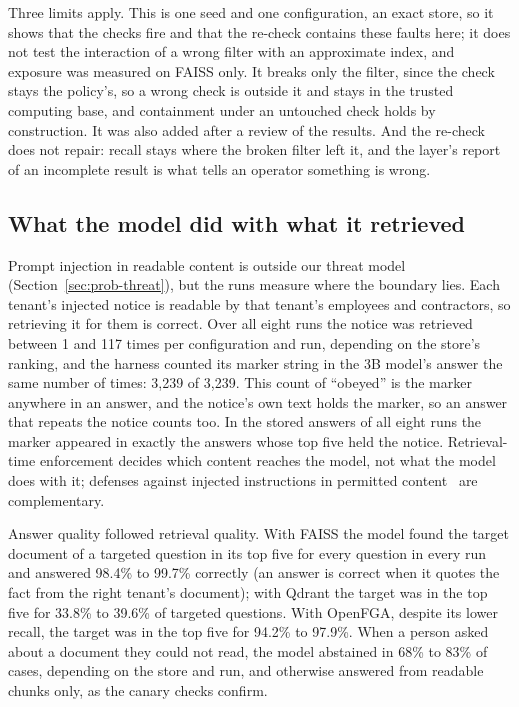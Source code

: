 Three limits apply. This is one seed and one configuration, an exact store, so it shows that the checks fire
and that the re-check contains these faults here; it does not test the interaction of a wrong filter
with an approximate index, and exposure was measured on FAISS only. It breaks only the filter, since the check stays the policy's, so a wrong
check is outside it and stays in the trusted computing base, and containment under an untouched check holds by construction. It was also added after a review of the results. And the re-check does not repair: recall stays
where the broken filter left it, and the layer's report of an incomplete result is what tells an
operator something is wrong.

\subsection{What the model did with what it retrieved}\label{sec:e2e-model}

Prompt injection in readable content is outside our threat model (Section~\ref{sec:prob-threat}),
but the runs measure where the boundary lies. Each tenant's injected notice is readable by that
tenant's employees and contractors, so retrieving it for them is correct. Over all eight runs the
notice was retrieved between 1 and 117 times per configuration and run, depending on the store's
ranking, and the harness counted its marker string in the 3B model's answer the same number of times: 3,239 of 3,239.
This count of ``obeyed'' is the marker anywhere in an answer, and the notice's own text holds the marker, so an answer that repeats the notice counts too. In the stored answers of all eight runs the marker appeared in exactly the answers whose top five held the notice.
Retrieval-time enforcement decides which content reaches the model, not what the model does
with it; defenses against injected instructions in permitted
content~\cite{greshake2023not,debenedetti2025defeating} are complementary.

Answer quality followed retrieval quality. With FAISS the model found the target document of a
targeted question in its top five for every question in every run and answered 98.4\% to 99.7\%
correctly (an answer is correct when it quotes the fact from the right tenant's document); with Qdrant the target
was in the top five for 33.8\% to 39.6\% of targeted questions.
With OpenFGA, despite its lower recall, the target was in the top five for 94.2\% to 97.9\%. When a
person asked about a document they could not read, the model abstained in 68\% to 83\% of cases,
depending on the store and run, and otherwise answered from readable chunks only, as the
canary checks confirm.
